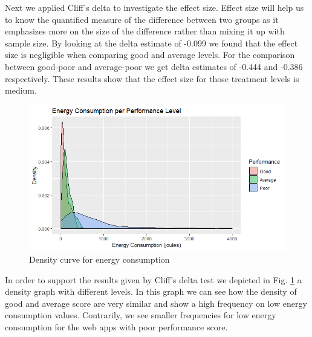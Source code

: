 Next we applied Cliff's delta to investigate the effect size. Effect size will help us to know the quantified measure of the difference between two groups as it emphasizes more on the size of the difference rather than mixing it up with sample size. By looking at the delta estimate of -0.099  we found that the effect size is negligible when comparing good and average levels. For the comparison between good-poor and average-poor we get delta estimates of -0.444 and -0.386 respectively. These results show that the effect size for those treatment levels is medium.

\begin{figure}[H]
  \includegraphics[width=\linewidth]{./NewImages/Fig_11_Density_Curve_Energy_Consumption.png}
  \caption{Density curve for energy consumption}
  \label{fig:density-levels}
\end{figure}

In order to support the results given by Cliff's delta test we depicted in Fig. \ref{fig:density-levels} a density graph with different levels. In this graph we can see how the density of good and average score are very similar and show a high frequency on low energy consumption values. Contrarily, we see smaller frequencies for low energy consumption for the web apps with poor performance score.




